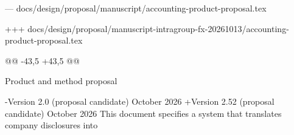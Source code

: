 --- docs/design/proposal/manuscript/accounting-product-proposal.tex

+++ docs/design/proposal/manuscript-intragroup-fx-20261013/accounting-product-proposal.tex

@@ -43,5 +43,5 @@

 {\Large Product and method proposal\par}
 \vspace{5mm}
-Version 2.0 (proposal candidate)  October 2026
+Version 2.52 (proposal candidate)  October 2026
 \vfill
 This document specifies a system that translates company disclosures into
